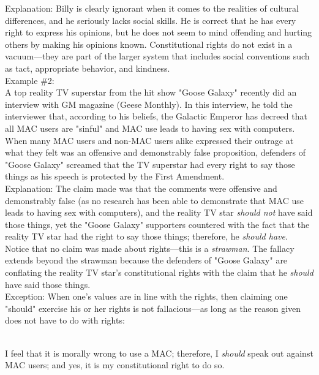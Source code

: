 \documentclass[a4paper,12pt,single,pdftex]{scrartcl}
\begin{document}
    
      Explanation: Billy is clearly ignorant when it comes to the realities of cultural differences, and he seriously lacks social skills.  He is correct that he has every right to express his opinions, but he does not seem to mind offending and hurting others by making his opinions known.  Constitutional rights do not exist in a vacuum—they are part of the larger system that includes social conventions such as tact, appropriate behavior, and kindness.
    \\

    
      Example \#2:
    \\

    
      A top reality TV superstar from the hit show "Goose Galaxy" recently did an interview with GM magazine (Geese Monthly).  In this interview, he told the interviewer that, according to his beliefs, the Galactic Emperor has decreed that all MAC users are "sinful" and MAC use leads to having sex with computers.  When many MAC users and non-MAC users alike expressed their outrage at what they felt was an offensive and demonstrably false proposition, defenders of "Goose Galaxy" screamed that the TV superstar had every right to say those things as his speech is protected by the First Amendment.
    \\

    
      Explanation: The claim made was that the comments were offensive and demonstrably false (as no research has been able to demonstrate that MAC use leads to having sex with computers), and the reality TV star {\it should not} have said those things, yet the "Goose Galaxy" supporters countered with the fact that the reality TV star had the right to say those things; therefore, he {\it should have}.  Notice that no claim was made about rights—this is a {\it strawman}.  The fallacy extends beyond the strawman because the defenders of "Goose Galaxy" are conflating the reality TV star's constitutional rights with the claim that he {\it should}  have said those things.
    \\

    
      Exception: When one's values are in line with the rights, then claiming one "should" exercise his or her rights is not fallacious—as long as the reason given does not have to do with rights: \newline

    \\

    
      I feel that it is morally wrong to use a MAC; therefore, I {\it should}  speak out against MAC users; and yes, it is my constitutional right to do so.
    \\
\end{document}
